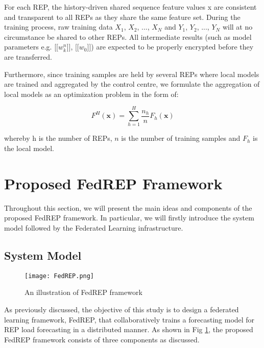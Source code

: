 \documentclass[10pt, conference]{IEEEtran}
\begin{document}
For each REP, the history-driven shared sequence feature values x are consistent and transparent to all REPs as they share the same feature set. During the training process, raw training data {$X_1$, $X_2$, ..., $X_N$} and {$Y_1$, $Y_2$, ..., $Y_N$} will at no circumstance be shared to other REPs. All intermediate results (such as model parameters e.g. [[$w^n_k$]], [[$w_0$]]) are expected to be properly encrypted before they are transferred.

Furthermore, since training samples are held by several REPs where local models are trained and aggregated by the control centre, we formulate the aggregation of local models as an optimization problem in the form of:

\begin{equation}
    F^H(\textbf{x}) = \sum^H_{h=1} \dfrac{n_h}{n} F_h(\textbf{x})
\end{equation}

\noindent
whereby h is the number of REPs, $n$ is the number of training samples and $F_h$ is the local model.

\section{Proposed FedREP Framework}
\label{sec:proposedframework}
Throughout this section, we will present the main ideas and components of the proposed FedREP framework. In particular, we will firstly introduce the system model followed by the Federated Learning infrastructure.

\subsection{System Model}

\begin{figure}
    \centering
    \texttt{[image: FedREP.png]}
    \caption{An illustration of FedREP framework}
    \label{fig:FedREPillustration}
\end{figure}

As previously discussed, the objective of this study is to design a federated learning framework, FedREP, that collaboratively trains a forecasting model for REP load forecasting in a distributed manner. As shown in Fig \ref{fig:FedREPillustration}, the proposed FedREP framework consists of three components as discussed.
\end{document}
